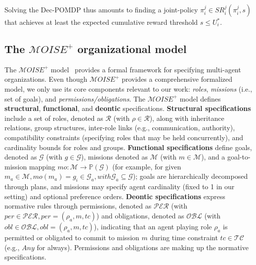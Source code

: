 \documentclass[pdflatex,sn-mathphys-num]{sn-jnl}%
\theoremstyle{thmstyleone}%
\theoremstyle{thmstyletwo}%
\theoremstyle{thmstylethree}%
\begin{document}
\noindent Solving the Dec-POMDP thus amounts to finding a joint-policy $\pi^j_i \in SR^j_i(\pi^j_i, s)$ that achieves at least the expected cumulative reward threshold $s \leq U_i^*$.

\subsection{The $\mathcal{M}OISE^+$ organizational model}

The $\mathcal{M}OISE^+$ model~\cite{Hubner2002, Hubner2007} provides a formal framework for specifying multi-agent organizations. Even though $\mathcal{M}OISE^+$ provides a comprehensive formalized model, we only use its core components relevant to our work: \textit{roles}, \textit{missions} (i.e., set of goals), and \textit{permissions/obligations}.
%
The $\mathcal{M}OISE^+$ model defines \textbf{structural}, \textbf{functional}, and \textbf{deontic} specifications. \textbf{Structural specifications} include a set of roles, denoted as $\mathcal{R}$ (with $\rho \in \mathcal{R}$), along with inheritance relations, group structures, inter-role links (e.g., communication, authority), compatibility constraints (specifying roles that may be held concurrently), and cardinality bounds for roles and groups. \textbf{Functional specifications} define goals, denoted as $\mathcal{G}$ (with $g \in \mathcal{G}$), missions denoted as $\mathcal{M}$ (with $m \in \mathcal{M}$), and a goal-to-mission mapping $mo: \mathcal{M} \rightarrow \mathbb{P}(\mathcal{G})$ (for example, for given $m_a \in \mathcal{M}, mo(m_a) = {g_i \in \mathcal{G}_a}, with \mathcal{G}_a \subseteq \mathcal{G}$); goals are hierarchically decomposed through plans, and missions may specify agent cardinality (fixed to 1 in our setting) and optional preference orders. \textbf{Deontic specifications} express normative rules through permissions, denoted as $\mathcal{PER}$ (with $per \in \mathcal{PER}, per = (\rho_a, m, tc)$) and obligations, denoted as $\mathcal{OBL}$ (with $obl \in \mathcal{OBL}, obl = (\rho_a, m, tc)$), indicating that an agent playing role $\rho_a$ is permitted or obligated to commit to mission $m$ during time constraint $tc \in \mathcal{TC}$ (e.g., $Any$ for always). Permissions and obligations are making up the normative specifications.
\end{document}
